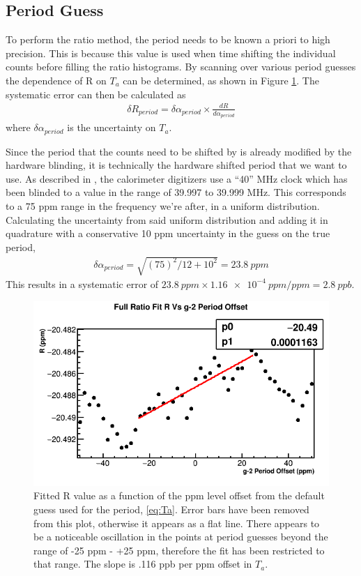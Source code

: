 	\subsection{\gmtwo Period Guess}
	\label{SubSec:gm2Guess}

		To perform the ratio method, the \gmtwo period needs to be known a priori to high precision. This is because this value is used when time shifting the individual counts before filling the ratio histograms. By scanning over various \gmtwo period guesses the dependence of R on $T_{a}$ can be determined, as shown in Figure \ref{fig:gm2PeriodGuess}. The systematic error can then be calculated as 
			\begin{align}
				\delta R_{period} = \delta\alpha_{period} \times \frac{dR}{d\alpha_{period}}
			\end{align}
		where $\delta\alpha_{period}$ is the uncertainty on $T_{a}$. 

		Since the period that the counts need to be shifted by is already modified by the hardware blinding, it is technically the hardware shifted \gmtwo period that we want to use. As described in \cite{ClockManual}, the calorimeter digitizers use a ``40'' MHz clock which has been blinded to a value in the range of 39.997 to 39.999 MHz. This corresponds to a 75 ppm range in the frequency we're after, in a uniform distribution. Calculating the uncertainty from said uniform distribution and adding it in quadrature with a conservative 10 ppm uncertainty in the guess on the true \gmtwo period, 
			\begin{align}
				\delta\alpha_{period} = \sqrt{(75)^{2}/12 + 10^{2}} = \SI{23.8}{ppm}
			\end{align}
		This results in a systematic error of $\SI{23.8}{ppm} \times \SI{1.16e-4}{ppm/ppm} = \SI{2.8}{ppb}$.

		\begin{figure}[]
			\centering
			\includegraphics[width=.6\textwidth]{RatioCBO_R_Vs_gm2PeriodGuess_Canv}
		    \caption[gm2PeriodGuess]{Fitted R value as a function of the ppm level offset from the default guess used for the \gmtwo period, \ref{eq:Ta}. Error bars have been removed from this plot, otherwise it appears as a flat line. There appears to be a noticeable oscillation in the points at \gmtwo period guesses beyond the range of -25 ppm - +25 ppm, therefore the fit has been restricted to that range. The slope is .116 ppb per ppm offset in $T_{a}$.}
		    \label{fig:gm2PeriodGuess}
		\end{figure}

